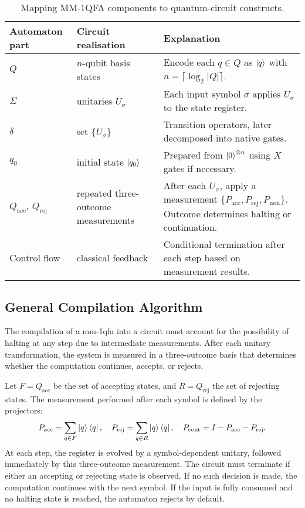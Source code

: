 \vspace{6pt}
\begin{table}[H]
\centering
\footnotesize
\begin{tabularx}{\textwidth}{>{\raggedright\arraybackslash}p{}%
                        >{\raggedright\arraybackslash}p{}X}
\toprule
\textbf{Automaton part} & \textbf{Circuit realisation} & \textbf{Explanation} \\
\midrule
$Q$ & $n$-qubit basis states & Encode each $q \in Q$ as $\ket{q}$ with $n = \lceil \log_2 |Q| \rceil$. \\

$\Sigma$ & unitaries $U_\sigma$ & Each input symbol $\sigma$ applies $U_\sigma$ to the state register. \\

$\delta$ & set $\{U_\sigma\}$ & Transition operators, later decomposed into native gates. \\

$q_0$ & initial state $\ket{q_0}$ & Prepared from $\ket{0}^{\otimes n}$ using $X$ gates if necessary. \\

$Q_{\text{acc}}$, $Q_{\text{rej}}$ & repeated three-outcome measurements & After each $U_\sigma$, apply a measurement $\{P_{\text{acc}}, P_{\text{rej}}, P_{\text{non}}\}$. Outcome determines halting or continuation. \\

Control flow & classical feedback & Conditional termination after each step based on measurement results. \\
\bottomrule
\end{tabularx}
\caption{Mapping MM-1QFA components to quantum-circuit constructs.}
\label{tab:mmqfa-mapping}
\end{table}


\subsection{General Compilation Algorithm}
\label{sec:mmqfa-algorithm}

The compilation of a \gls{mm-1qfa} into a circuit must account for the possibility of halting at any step due to intermediate measurements. After each unitary transformation, the system is measured in a three-outcome basis that determines whether the computation continues, accepts, or rejects.

Let $F = Q_{\text{acc}}$ be the set of accepting states, and $R = Q_{\text{rej}}$ the set of rejecting states. The measurement performed after each symbol is defined by the projectors:
\[
P_{\text{acc}} = \sum_{q \in F} \ket{q}\bra{q}, \quad
P_{\text{rej}} = \sum_{q \in R} \ket{q}\bra{q}, \quad
P_{\text{cont}} = I - P_{\text{acc}} - P_{\text{rej}}.
\]
At each step, the register is evolved by a symbol-dependent unitary, followed immediately by this three-outcome measurement. The circuit must terminate if either an accepting or rejecting state is observed. If no such decision is made, the computation continues with the next symbol. If the input is fully consumed and no halting state is reached, the automaton rejects by default.


